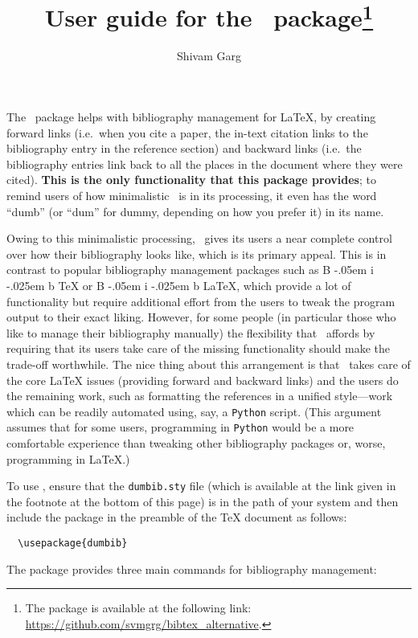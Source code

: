 \documentclass[letter, 11pt]{article}
\title{User guide for the \dumbib\ package\footnote{The package is available at the following link: \url{https://github.com/svmgrg/bibtex_alternative}.}}
\author{Shivam Garg}
\def\Bib{%
  {%
    \rm
    B%
    \kern-.05em%
    {%
      \sc
      i%
      \kern-.025em %
      b%
    }%
  }%
}
\begin{document}
\maketitle

The \dumbib\ package helps with bibliography management for \LaTeX{}, by creating forward links (i.e.\ when you cite a paper, the in-text citation links to the bibliography entry in the reference section) and backward links (i.e.\ the bibliography entries link back to all the places in the document where they were cited). \textbf{This is the only functionality that this package provides}; to remind users of how minimalistic \dumbib\ is in its processing, it even has the word ``dumb'' (or ``dum'' for dummy, depending on how you prefer it) in its name.

Owing to this minimalistic processing, \dumbib\ gives its users a near complete control over how their bibliography looks like, which is its primary appeal. This is in contrast to popular bibliography management packages such as \Bib\TeX{} or \Bib\LaTeX, which provide a lot of functionality but require additional effort from the users to tweak the program output to their exact liking. However, for some people (in particular those who like to manage their bibliography manually) the flexibility that \dumbib\ affords by requiring that its users take care of the missing functionality should make the trade-off worthwhile. The nice thing about this arrangement is that \dumbib\ takes care of the core \LaTeX{} issues (providing forward and backward links) and the users do the remaining work, such as formatting the references in a unified style---work which can be readily automated using, say, a \texttt{Python} script. (This argument assumes that for some users, programming in \texttt{Python} would be a more comfortable experience than tweaking other bibliography packages or, worse, programming in \LaTeX.)

To use \dumbib, ensure that the \texttt{dumbib.sty} file (which is available at the link given in the footnote at the bottom of this page) is in the path of your system and then include the package in the preamble of the \TeX{} document as follows:
\begin{verbatim}
  \usepackage{dumbib}
\end{verbatim}
The package provides three main commands for bibliography management:
\end{document}
